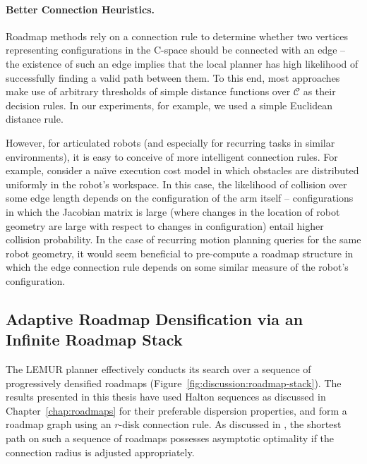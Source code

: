 \paragraph{Better Connection Heuristics.}
Roadmap methods rely on a connection rule to determine whether
two vertices representing configurations in the C-space
should be connected with an edge
-- the existence of such an edge implies that the local planner
has high likelihood of successfully finding a valid path between them.
To this end,
most approaches make use of arbitrary thresholds of
simple distance functions over $\mathcal{C}$ as their decision rules.
In our experiments, for example,
we used a simple Euclidean distance rule.

However, for articulated robots
(and especially for recurring tasks in similar environments),
it is easy to conceive of more intelligent connection rules.
For example, consider a na\"{\i}ve execution cost model in which
obstacles are distributed uniformly in the robot's workspace.
In this case,
the likelihood of collision over some edge length
depends on the configuration of the arm itself
-- configurations in which the Jacobian matrix is large
(where changes in the location of robot geometry are large
with respect to changes in configuration)
entail higher collision probability.
In the case of recurring motion planning queries for the same
robot geometry,
it would seem beneficial to pre-compute a roadmap structure
in which the edge connection rule depends on some similar measure
of the robot's configuration.


\subsection{Adaptive Roadmap Densification via an Infinite Roadmap Stack}
\label{subsec:conclusion:infinite-stack}

\label{sec:discussion:disc}
The LEMUR planner effectively conducts its search over a sequence of
progressively densified roadmaps
(Figure~\ref{fig:discussion:roadmap-stack}).
The results presented in this thesis have used Halton sequences
as discussed in Chapter~\ref{chap:roadmaps}
for their preferable dispersion properties,
and form a roadmap graph using an $r$-disk connection rule.
As discussed in \citep{janson2015deterministicsampling},
the shortest path on such a sequence of roadmaps
possesses asymptotic optimality if the connection radius is adjusted
appropriately.


